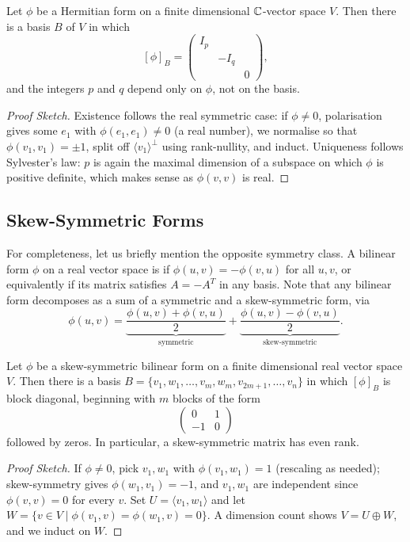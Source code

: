 \documentclass[a4paper]{scrartcl}
\begin{document}
\begin{theorem}
    Let $\phi$ be a Hermitian form on a finite dimensional $\mathbb{C}$-vector space $V$. Then there is a basis $B$ of $V$ in which
    $$
    [\phi]_B = \begin{pmatrix}
        I_p & & \\
        & -I_q & \\
        & & 0
    \end{pmatrix},
    $$
    and the integers $p$ and $q$ depend only on $\phi$, not on the basis.
\end{theorem}
\begin{proof}[Proof Sketch]
    Existence follows the real symmetric case: if $\phi \neq 0$, polarisation gives some $e_1$ with $\phi(e_1, e_1) \neq 0$ (a real number), we normalise so that $\phi(v_1, v_1) = \pm 1$, split off $\langle v_1 \rangle^\perp$ using rank-nullity, and induct. Uniqueness follows Sylvester's law: $p$ is again the maximal dimension of a subspace on which $\phi$ is positive definite, which makes sense as $\phi(v,v)$ is real.
\end{proof}

\subsection{Skew-Symmetric Forms}

For completeness, let us briefly mention the opposite symmetry class. A bilinear form $\phi$ on a real vector space is  if $\phi(u, v) = -\phi(v, u)$ for all $u, v$, or equivalently if its matrix satisfies $A = -A^T$ in any basis. Note that any bilinear form decomposes as a sum of a symmetric and a skew-symmetric form, via
$$
\phi(u,v) = \underbrace{\frac{\phi(u,v) + \phi(v,u)}{2}}_{\text{symmetric}} + \underbrace{\frac{\phi(u,v) - \phi(v,u)}{2}}_{\text{skew-symmetric}}.
$$

\begin{theorem}
    Let $\phi$ be a skew-symmetric bilinear form on a finite dimensional real vector space $V$. Then there is a basis $B = \{v_1, w_1, \dots, v_m, w_m, v_{2m + 1}, \dots, v_n\}$ in which $[\phi]_B$ is block diagonal, beginning with $m$ blocks of the form
    $$
    \begin{pmatrix}
        0 & 1 \\ -1 & 0
    \end{pmatrix}
    $$
    followed by zeros. In particular, a skew-symmetric matrix has even rank.
\end{theorem}
\begin{proof}[Proof Sketch]
    If $\phi \neq 0$, pick $v_1, w_1$ with $\phi(v_1, w_1) = 1$ (rescaling as needed); skew-symmetry gives $\phi(w_1, v_1) = -1$, and $v_1, w_1$ are independent since $\phi(v, v) = 0$ for every $v$. Set $U = \langle v_1, w_1 \rangle$ and let $W = \{v \in V \mid \phi(v_1, v) = \phi(w_1, v) = 0\}$. A dimension count shows $V = U \oplus W$, and we induct on $W$.
\end{proof}
\end{document}
